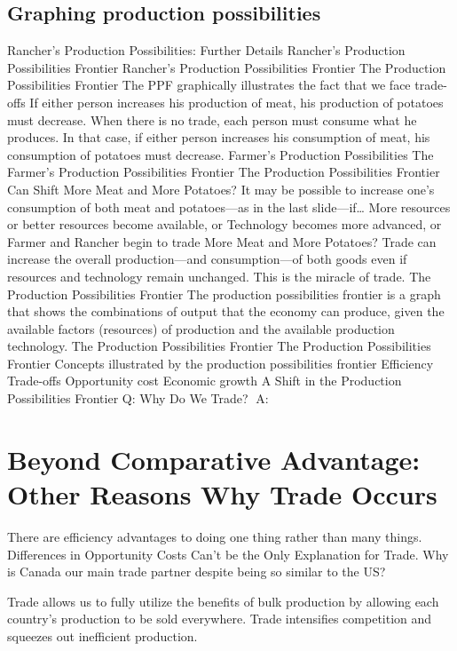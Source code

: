 \documentclass[
  letterpaper,
]{book}
\begin{document}
\subsection{Graphing production
possibilities}\label{graphing-production-possibilities}

Rancher's Production Possibilities: Further Details Rancher's Production
Possibilities Frontier Rancher's Production Possibilities Frontier The
Production Possibilities Frontier The PPF graphically illustrates the
fact that we face trade-offs If either person increases his production
of meat, his production of potatoes must decrease. When there is no
trade, each person must consume what he produces. In that case, if
either person increases his consumption of meat, his consumption of
potatoes must decrease. Farmer's Production Possibilities The Farmer's
Production Possibilities Frontier The Production Possibilities Frontier
Can Shift More Meat and More Potatoes? It may be possible to increase
one's consumption of both meat and potatoes---as in the last
slide---if\ldots{} More resources or better resources become available,
or Technology becomes more advanced, or Farmer and Rancher begin to
trade More Meat and More Potatoes? Trade can increase the overall
production---and consumption---of both goods even if resources and
technology remain unchanged. This is the miracle of trade. The
Production Possibilities Frontier The production possibilities frontier
is a graph that shows the combinations of output that the economy can
produce, given the available factors (resources) of production and the
available production technology. The Production Possibilities Frontier
The Production Possibilities Frontier Concepts illustrated by the
production possibilities frontier Efficiency Trade-offs Opportunity cost
Economic growth A Shift in the Production Possibilities Frontier Q: Why
Do We Trade? A:

\section{Beyond Comparative Advantage: Other Reasons Why Trade
Occurs}\label{beyond-comparative-advantage-other-reasons-why-trade-occurs}

There are efficiency advantages to doing one thing rather than many
things. Differences in Opportunity Costs Can't be the Only Explanation
for Trade. Why is Canada our main trade partner despite being so similar
to the US?

Trade allows us to fully utilize the benefits of bulk production by
allowing each country's production to be sold everywhere. Trade
intensifies competition and squeezes out inefficient production.
\end{document}
